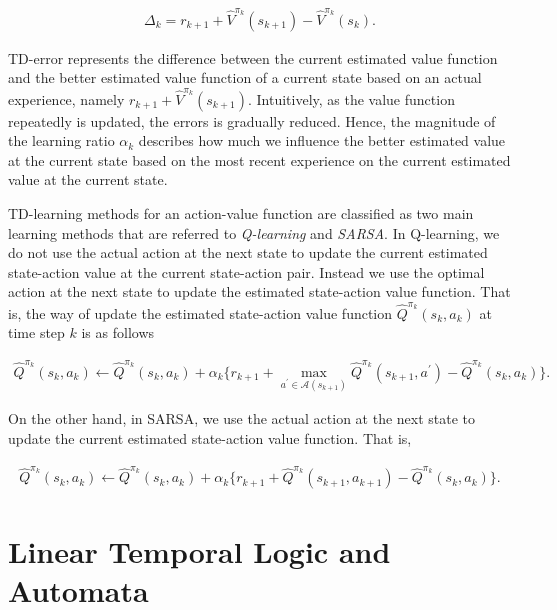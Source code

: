 \begin{align}
  \Delta_k = r_{k+1} + \hat{V}^{\pi_k}(s_{k+1}) - \hat{V}^{\pi_k}(s_k).
\end{align}

TD-error represents the difference between the current estimated value function and the better estimated value function of a current state based on an actual experience, namely $r_{k+1} + \hat{V}^{\pi_k}(s_{k+1})$. Intuitively, as the value function repeatedly is updated, the errors is gradually reduced. Hence, the magnitude of the learning ratio $\alpha_k$ describes how much we influence the better estimated value at the current state based on the most recent experience on the current estimated value at the current state.

TD-learning methods for an action-value function are classified as two main learning methods that are referred to {\it Q-learning} and {\it SARSA}.
In Q-learning, we do not use the actual action at the next state to update the current estimated state-action value at the current state-action pair. Instead we use the optimal action at the next state to update the estimated state-action value function. That is, the way of update the estimated state-action value function $\hat{Q}^{\pi_k}(s_k, a_k)$ at time step $k$ is as follows

\begin{align}
  \hat{Q}^{\pi_k}(s_k,a_k) \leftarrow \hat{Q}^{\pi_k}(s_k,a_k) + \alpha_k \{ r_{k+1} + \max_{a^{\prime} \in \mathcal{A}(s_{k+1})} \hat{Q}^{\pi_k}(s_{k+1}, a^{\prime}) - \hat{Q}^{\pi_k}(s_k,a_k) \}.
\end{align}

On the other hand, in SARSA, we use the actual action at the next state to update the current estimated state-action value function. That is,

\begin{align}
  \hat{Q}^{\pi_k}(s_k,a_k) \leftarrow \hat{Q}^{\pi_k}(s_k,a_k) + \alpha_k \{ r_{k+1} + \hat{Q}^{\pi_k}(s_{k+1}, a_{k+1}) - \hat{Q}^{\pi_k}(s_k,a_k) \}.
\end{align}

\section{Linear Temporal Logic and Automata}

